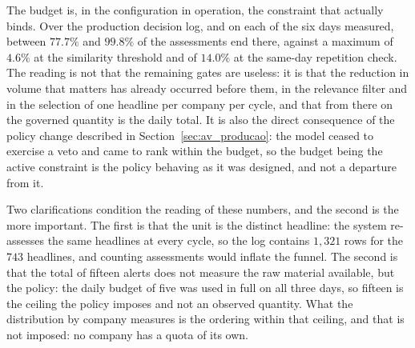 The budget is, in the configuration in operation, the constraint that actually binds. Over the
production decision log, and on each of the six days measured, between $77.7\%$ and $99.8\%$ of the
assessments end there, against a maximum of $4.6\%$ at the similarity threshold and of $14.0\%$ at
the same-day repetition check. The reading is not that the remaining gates are useless: it is that
the reduction in volume that matters has already occurred before them, in the relevance filter and
in the selection of one headline per company per cycle, and that from there on the governed
quantity is the daily total. It is also the direct consequence of the policy change described in
Section~\ref{sec:av_producao}: the model ceased to exercise a veto and came to rank within the
budget, so the budget being the active constraint is the policy behaving as it was designed, and
not a departure from it.

Two clarifications condition the reading of these numbers, and the second is the more important.
The first is that the unit is the distinct headline: the system re-assesses the same headlines at
every cycle, so the log contains $1{,}321$ rows for the $743$ headlines, and counting assessments
would inflate the funnel. The second is that the total of fifteen alerts does not measure the raw
material available, but the policy: the daily budget of five was used in full on all three days, so
fifteen is the ceiling the policy imposes and not an observed quantity. What the distribution by
company measures is the ordering within that ceiling, and that is not imposed: no company has a
quota of its own.

